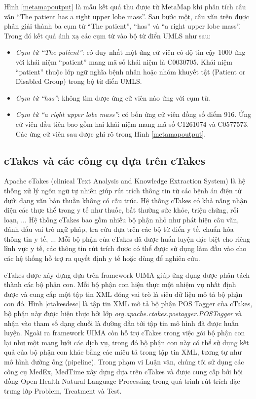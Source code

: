 Hình \ref{metamapoutput} là mẫu kết quả thu được từ MetaMap khi phân tích câu văn ``The patient has a right upper lobe mass''. Sau bước một, câu văn trên được phân giải thành ba cụm từ ``The patient'', ``has'' và ``a right upper lobe mass''. Trong đó kết quả ánh xạ các cụm từ vào bộ từ điển UMLS như sau:

\begin{itemize}[noitemsep]
\item \emph{Cụm từ ``The patient''}: có duy nhất một ứng cử viên có độ tin cậy 1000 ứng với khái niệm ``patient'' mang mã số khái niệm là C0030705. Khái niệm ``patient'' thuộc lớp ngữ nghĩa bệnh nhân hoặc nhóm khuyết tật (Patient or Disabled Group) trong bộ từ điển UMLS.
\item \emph{Cụm từ ``has''}: không tìm được ứng cử viên nào ứng với cụm từ.
\item \emph{Cụm từ ``a right upper lobe mass''}: có bốn ứng cử viên đồng số điểm 916. Ứng cử viên đầu tiên bao gồm hai khái niệm mang mã số C1261074 và C0577573. Các ứng cử viên sau được ghi rõ trong Hình \ref{metamapoutput}. 
\end{itemize}

\subsection*{cTakes và các công cụ dựa trên cTakes}
Apache cTakes (clinical Text Analysis and Knowledge Extraction System) là hệ thống xử lý ngôn ngữ tự nhiên giúp rút trích thông tin từ các bệnh án điện tử dưới dạng văn bản thuần không có cấu trúc. Hệ thống cTakes có khả năng nhận diện các thực thể trong y tế như thuốc, bất thường sức khỏe, triệu chứng, rối loạn, ... Hệ thống cTakes bao gồm nhiều bộ phận nhỏ như phát hiện câu văn, đánh dấu vai trò ngữ pháp, tra cứu dựa trên các bộ từ điển y tế, chuẩn hóa thông tin y tế, ... Mỗi bộ phận của cTakes đã được huấn luyện đặc biệt  cho riêng lĩnh vực y tế, các thông tin rút trích được có thể được sử dụng làm đầu vào cho các hệ thống hỗ trợ ra quyết định y tế hoặc dùng để nghiên cứu.

cTakes được xây dựng dựa trên framework UIMA giúp ứng dụng được phân tách thành các bộ phận con. Mỗi bộ phận con hiện thực một nhiệm vụ nhất định được và cung cấp một tập tin XML đóng vai trò là siêu dữ liệu mô tả bộ phận con đó. Hình \ref{ctakesdesc} là tập tin XML mô tả bộ phận POS Tagger của cTakes, bộ phận này được hiện thực bởi lớp \textit{org.apache.ctakes.postagger.POSTagger} và nhận vào tham số dạng chuỗi là đường dẫn tới tập tin mô hình đã được huấn luyện. Ngoài ra framework UIMA còn hỗ trợ cTakes trong việc gói bộ phận con lại như một mạng lưới các dịch vụ, trong đó bộ phận con này có thể sử dụng kết quả của bộ phận con khác bằng các miêu tả trong tập tin XML, tương tự như mô hình đường ống (pipeline). Trong phạm vi Luận văn, chúng tôi sử dụng các công cụ MedEx, MedTime xây dựng dựa trên cTakes và được cung cấp bởi hội đồng Open Health Natural Language Processing trong quá trình rút trích đặc trưng lớp Problem, Treatment và Test.

